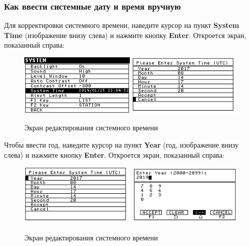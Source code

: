 
\subsubsection{Как ввести системные дату и время вручную}

Для корректировки системного времени, наведите курсор на пункт \textbf{System
  Time} (изображение внизу слева) и нажмите кнопку \textbf{Enter}. Откроется
экран, показанный справа:

\newpage
\begin{figure}[H]
  \centering
  \includegraphics[width=0.49\textwidth]{figures/the_system_time_editing_screen_1}
  \includegraphics[width=0.49\textwidth]{figures/the_system_time_editing_screen_2}
  \caption{Экран редактирования системного времени}
  \label{fig:the_system_time_editing_screen_1}
\end{figure}

Чтобы ввести год, наведите курсор на пункт \textbf{Year} (год, изображение внизу
слева) и нажмите кнопку \textbf{Enter}. Откроется экран, показанный справа:

\begin{figure}[H]
  \centering
  \includegraphics[width=0.49\textwidth]{figures/the_system_time_editing_screen_3}
  \includegraphics[width=0.49\textwidth]{figures/the_system_time_editing_screen_4}
  \caption{Экран редактирования системного времени}
  \label{fig:the_system_time_editing_screen_2}
\end{figure}

